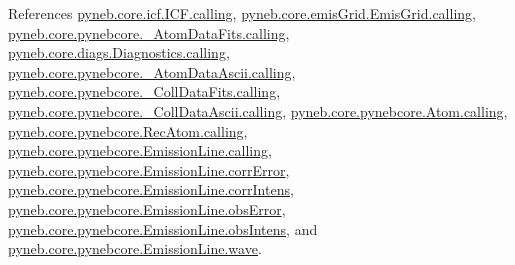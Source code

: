 References \hyperlink{icf_8py_source_l00016}{pyneb.\+core.\+icf.\+I\+C\+F.\+calling}, \hyperlink{emis_grid_8py_source_l00041}{pyneb.\+core.\+emis\+Grid.\+Emis\+Grid.\+calling}, \hyperlink{pynebcore_8py_source_l00090}{pyneb.\+core.\+pynebcore.\+\_\+\+Atom\+Data\+Fits.\+calling}, \hyperlink{diags_8py_source_l00169}{pyneb.\+core.\+diags.\+Diagnostics.\+calling}, \hyperlink{pynebcore_8py_source_l00311}{pyneb.\+core.\+pynebcore.\+\_\+\+Atom\+Data\+Ascii.\+calling}, \hyperlink{pynebcore_8py_source_l00568}{pyneb.\+core.\+pynebcore.\+\_\+\+Coll\+Data\+Fits.\+calling}, \hyperlink{pynebcore_8py_source_l00918}{pyneb.\+core.\+pynebcore.\+\_\+\+Coll\+Data\+Ascii.\+calling}, \hyperlink{pynebcore_8py_source_l01175}{pyneb.\+core.\+pynebcore.\+Atom.\+calling}, \hyperlink{pynebcore_8py_source_l02572}{pyneb.\+core.\+pynebcore.\+Rec\+Atom.\+calling}, \hyperlink{pynebcore_8py_source_l03263}{pyneb.\+core.\+pynebcore.\+Emission\+Line.\+calling}, \hyperlink{pynebcore_8py_source_l03317}{pyneb.\+core.\+pynebcore.\+Emission\+Line.\+corr\+Error}, \hyperlink{pynebcore_8py_source_l03301}{pyneb.\+core.\+pynebcore.\+Emission\+Line.\+corr\+Intens}, \hyperlink{pynebcore_8py_source_l03312}{pyneb.\+core.\+pynebcore.\+Emission\+Line.\+obs\+Error}, \hyperlink{pynebcore_8py_source_l03299}{pyneb.\+core.\+pynebcore.\+Emission\+Line.\+obs\+Intens}, and \hyperlink{pynebcore_8py_source_l03270}{pyneb.\+core.\+pynebcore.\+Emission\+Line.\+wave}.


